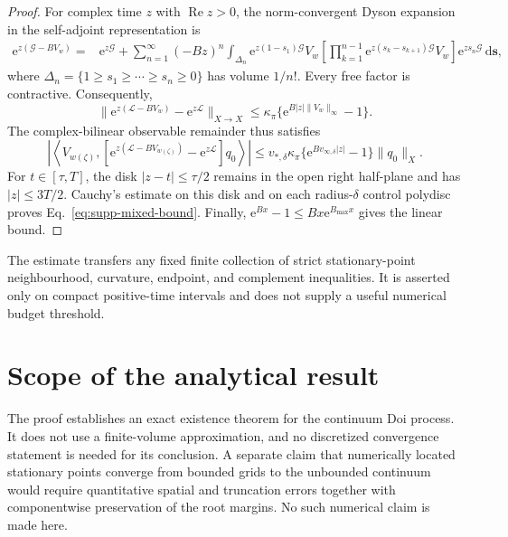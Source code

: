 \documentclass[aps,physrev,onecolumn,amsmath,amssymb,longbibliography]{revtex4-2}
\newcommand{\dd}{\mathrm d}
\newcommand{\e}{\mathrm e}
\newcommand{\Lfree}{\mathcal L}
\begin{document}
\begin{proof}
For complex time \(z\) with \(\operatorname{Re}z>0\), the
norm-convergent Dyson expansion in the self-adjoint representation is
\begin{align}
 \e^{z(\mathcal G-BV_w)}
 ={}&\e^{z\mathcal G}
 +\sum_{n=1}^{\infty}(-Bz)^n
 \int_{\Delta_n}\e^{z(1-s_1)\mathcal G}V_w
 \left[\prod_{k=1}^{n-1}
 \e^{z(s_k-s_{k+1})\mathcal G}V_w\right]
 \e^{zs_n\mathcal G}\,\dd\bm s ,
 \label{eq:supp-dyson}
\end{align}
where
\(\Delta_n=\{1\ge s_1\ge\cdots\ge s_n\ge0\}\) has volume \(1/n!\).
Every free factor is contractive.  Consequently,
\begin{equation}
 \|\e^{z(\Lfree-BV_w)}-\e^{z\Lfree}\|_{X\to X}
 \le\kappa_\pi\{\e^{B|z|\|V_w\|_\infty}-1\}.
 \label{eq:supp-operator-bound}
\end{equation}
The complex-bilinear observable remainder thus satisfies
\begin{equation}
 \left|\left\langle V_{w(\zeta)},
 [\e^{z(\Lfree-BV_{w(\zeta)})}-\e^{z\Lfree}]q_0
 \right\rangle\right|
 \le v_{*,\delta}\kappa_\pi
 \{\e^{Bv_{\infty,\delta}|z|}-1\}\|q_0\|_X .
 \label{eq:supp-remainder}
\end{equation}
For \(t\in[\tau,T]\), the disk \(|z-t|\le\tau/2\) remains in the open
right half-plane and has \(|z|\le3T/2\).  Cauchy's estimate on this disk and
on each radius-\(\delta\) control polydisc proves
Eq.~\eqref{eq:supp-mixed-bound}.  Finally,
\(\e^{Bx}-1\le Bx\e^{B_{\max}x}\) gives the linear bound.
\end{proof}

The estimate transfers any fixed finite collection of strict
stationary-point neighbourhood, curvature, endpoint, and complement
inequalities.  It is asserted only on compact positive-time intervals and
does not supply a useful numerical budget threshold.



\section{Scope of the analytical result}
\label{sec:supp-scope}

The proof establishes an exact existence theorem for the continuum Doi
process.  It does not use a finite-volume approximation, and no discretized
convergence statement is needed for its conclusion.  A separate claim that
numerically located stationary points converge from bounded grids to the
unbounded continuum would require quantitative spatial and truncation errors
together with componentwise preservation of the root margins.  No such
numerical claim is made here.


\end{document}
